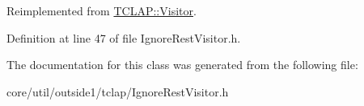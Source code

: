 Reimplemented from \hyperlink{classTCLAP_1_1Visitor_a08625664637579a24ba2f0ab3e713670}{T\+C\+L\+A\+P\+::\+Visitor}.



Definition at line 47 of file Ignore\+Rest\+Visitor.\+h.



The documentation for this class was generated from the following file\+:\begin{DoxyCompactItemize}
\item 
core/util/outside1/tclap/Ignore\+Rest\+Visitor.\+h\end{DoxyCompactItemize}
